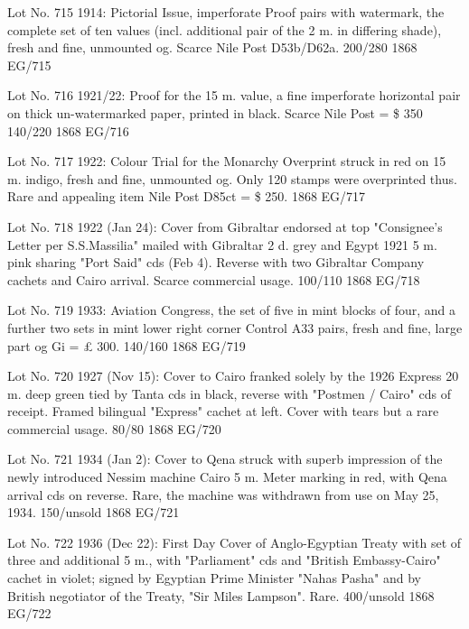 \documentclass[justified]{tufte-book}
\begin{document}
%
{Lot No. 715
1914: Pictorial Issue, imperforate Proof pairs with watermark, the complete set of ten values (incl. additional pair of the 2 m. in differing shade), fresh and fine, unmounted og. Scarce Nile Post D53b/D62a. 200/280
}%
{1868}%
{EG/715}%
{}%
{}
{}%
{}

%
{Lot No. 716
1921/22: Proof for the 15 m. value, a fine imperforate horizontal pair on thick un-watermarked paper, printed in black. Scarce Nile Post = \$ 350 140/220
}%
{1868}%
{EG/716}%
{}%
{}
{}%
{}

%
{Lot No. 717
1922: Colour Trial for the Monarchy Overprint struck in red on 15 m. indigo, fresh and fine, unmounted og. Only 120 stamps were overprinted thus. Rare and appealing item Nile Post D85ct = \$ 250.
}%
{1868}%
{EG/717}%
{}%
{}
{}%
{}

%
{Lot No. 718
1922 (Jan 24): Cover from Gibraltar endorsed at top "Consignee's Letter per S.S.Massilia" mailed with Gibraltar 2 d. grey and Egypt 1921 5 m. pink sharing "Port Said" cds (Feb 4). Reverse with two Gibraltar Company cachets and Cairo arrival. Scarce commercial usage. 100/110
}%
{1868}%
{EG/718}%
{}%
{}
{}%
{}

%
{Lot No. 719
1933: Aviation Congress, the set of five in mint blocks of four, and a further two sets in mint lower right corner Control A33 pairs, fresh and fine, large part og Gi = £ 300. 140/160
}%
{1868}%
{EG/719}%
{}%
{}
{}%
{}

%
{Lot No. 720
1927 (Nov 15): Cover to Cairo franked solely by the 1926 Express 20 m. deep green tied by Tanta cds in black, reverse with "Postmen / Cairo" cds of receipt. Framed bilingual "Express" cachet at left. Cover with tears but a rare commercial usage. 80/80
}%
{1868}%
{EG/720}%
{}%
{}
{}%
{}


%
{Lot No. 721
1934 (Jan 2): Cover to Qena struck with superb impression of the newly introduced Nessim machine Cairo 5 m. Meter marking in red, with Qena arrival cds on reverse. Rare, the machine was withdrawn from use on May 25, 1934. 150/unsold
}%
{1868}%
{EG/721}%
{}%
{}
{}%
{}

%
{Lot No. 722
1936 (Dec 22): First Day Cover of Anglo-Egyptian Treaty with set of three and additional 5 m., with "Parliament" cds and "British Embassy-Cairo" cachet in violet; signed by Egyptian Prime Minister "Nahas Pasha" and by British negotiator of the Treaty, "Sir Miles Lampson". Rare. 400/unsold
}%
{1868}%
{EG/722}%
{}%
{}
{}%
{}
\end{document}
